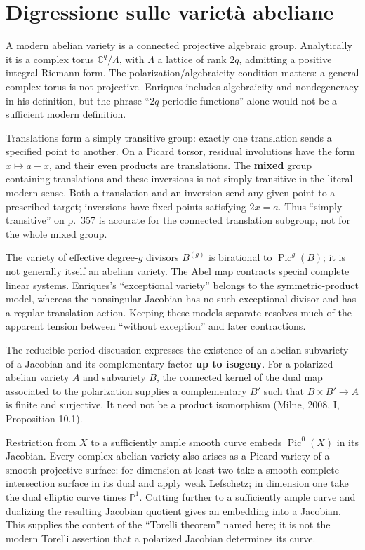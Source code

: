 \section{Digressione sulle varietà abeliane}\label{cp2-ix-9}

A modern abelian variety is a connected projective algebraic group. Analytically it is a complex torus \(\mathbb C^q/\Lambda\), with \(\Lambda\) a lattice of rank \(2q\), admitting a positive integral Riemann form. The polarization/algebraicity condition matters: a general complex torus is not projective. Enriques includes algebraicity and nondegeneracy in his definition, but the phrase ``\(2q\)-periodic functions'' alone would not be a sufficient modern definition.

Translations form a simply transitive group: exactly one translation sends a specified point to another. On a Picard torsor, residual involutions have the form \(x\mapsto a-x\), and their even products are translations. The \textbf{mixed} group containing translations and these inversions is not simply transitive in the literal modern sense. Both a translation and an inversion send any given point to a prescribed target; inversions have fixed points satisfying \(2x=a\). Thus ``simply transitive'' on p.~357 is accurate for the connected translation subgroup, not for the whole mixed group.

The variety of effective degree-\(g\) divisors \(B^{(g)}\) is birational to \(\operatorname{Pic}^g(B)\); it is not generally itself an abelian variety. The Abel map contracts special complete linear systems. Enriques's ``exceptional variety'' belongs to the symmetric-product model, whereas the nonsingular Jacobian has no such exceptional divisor and has a regular translation action. Keeping these models separate resolves much of the apparent tension between ``without exception'' and later contractions.

The reducible-period discussion expresses the existence of an abelian subvariety of a Jacobian and its complementary factor \textbf{up to isogeny}. For a polarized abelian variety \(A\) and subvariety \(B\), the connected kernel of the dual map associated to the polarization supplies a complementary \(B'\) such that \(B\times B'\to A\) is finite and surjective. It need not be a product isomorphism (Milne, 2008, I, Proposition 10.1).

Restriction from \(X\) to a sufficiently ample smooth curve embeds \(\operatorname{Pic}^0(X)\) in its Jacobian. Every complex abelian variety also arises as a Picard variety of a smooth projective surface: for dimension at least two take a smooth complete-intersection surface in its dual and apply weak Lefschetz; in dimension one take the dual elliptic curve times \(\mathbb P^1\). Cutting further to a sufficiently ample curve and dualizing the resulting Jacobian quotient gives an embedding into a Jacobian. This supplies the content of the ``Torelli theorem'' named here; it is not the modern Torelli assertion that a polarized Jacobian determines its curve.


